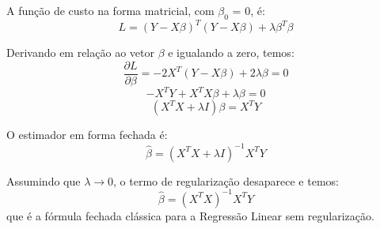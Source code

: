 A função de custo na forma matricial, com $ \beta_0 $ = 0, é:
$$ L = (Y - X\beta)^T(Y - X\beta) + \lambda \beta^T\beta $$

Derivando em relação ao vetor $ \beta $ e igualando a zero, temos:
$$ \frac{\partial L}{\partial \beta} = -2X^T(Y - X\beta) + 2\lambda\beta = 0 $$
$$ -X^T Y + X^T X \beta + \lambda\beta = 0 $$
$$ (X^T X + \lambda I)\beta = X^T Y $$

O estimador em forma fechada é:
$$ \hat{\beta} = (X^T X + \lambda I)^{-1}X^T Y $$






Assumindo que $ \lambda \to 0 $, o termo de regularização desaparece e temos:
$$ \hat{\beta} = (X^T X)^{-1}X^T Y $$
que é a fórmula fechada clássica para a Regressão Linear sem regularização.

